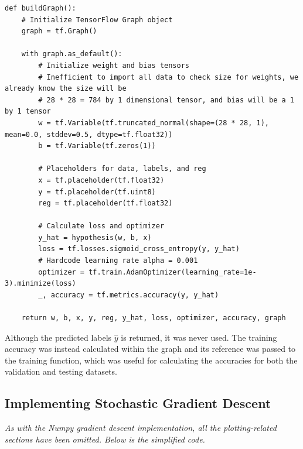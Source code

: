 \documentclass[letter]{article}
\begin{document}
\begin{lstlisting}
def buildGraph():
    # Initialize TensorFlow Graph object
    graph = tf.Graph()

    with graph.as_default():
        # Initialize weight and bias tensors
        # Inefficient to import all data to check size for weights, we already know the size will be
        # 28 * 28 = 784 by 1 dimensional tensor, and bias will be a 1 by 1 tensor
        w = tf.Variable(tf.truncated_normal(shape=(28 * 28, 1), mean=0.0, stddev=0.5, dtype=tf.float32))
        b = tf.Variable(tf.zeros(1))

        # Placeholders for data, labels, and reg
        x = tf.placeholder(tf.float32)
        y = tf.placeholder(tf.uint8)
        reg = tf.placeholder(tf.float32)

        # Calculate loss and optimizer
        y_hat = hypothesis(w, b, x)
        loss = tf.losses.sigmoid_cross_entropy(y, y_hat)
        # Hardcode learning rate alpha = 0.001
        optimizer = tf.train.AdamOptimizer(learning_rate=1e-3).minimize(loss)
        _, accuracy = tf.metrics.accuracy(y, y_hat)

    return w, b, x, y, reg, y_hat, loss, optimizer, accuracy, graph
\end{lstlisting}

Although the predicted labels $\hat{y}$ is returned, it was never used. The training accuracy was instead calculated within the graph and its reference was passed to the training function, which was useful for calculating the accuracies for both the validation and testing datasets.

\subsection{Implementing Stochastic Gradient Descent}

\textit{As with the Numpy gradient descent implementation, all the plotting-related sections have been omitted. Below is the simplified code.}
\end{document}
